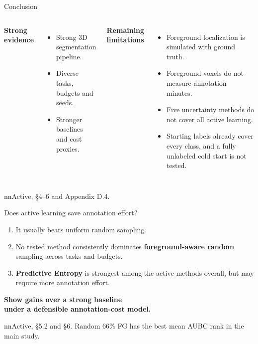 \documentclass[aspectratio=169,11pt]{beamer}
\newcommand{\source}[1]{\vfill{\color{Muted}\fontsize{7}{9}\selectfont #1\par}}
\newcommand{\takeaway}[1]{\vspace{0.2cm}\begin{center}{\color{Accent}\large\bfseries #1}\end{center}}
\begin{document}
\begin{frame}{Conclusion}
\begin{columns}[T,onlytextwidth]
{\color{Teal}\large\textbf{Strong evidence}}\par\vspace{.2cm}
\begin{itemize}\setlength{\itemsep}{8pt}
\item Strong 3D segmentation pipeline.
\item Diverse tasks, budgets and seeds.
\item Stronger baselines and cost proxies.
\end{itemize}
{\color{Accent}\large\textbf{Remaining limitations}}\par\vspace{.2cm}
\begin{itemize}\setlength{\itemsep}{8pt}
\item Foreground localization is simulated with ground truth.
\item Foreground voxels do not measure annotation minutes.
\item Five uncertainty methods do not cover all active learning.
\item Starting labels already cover every class, and a fully unlabeled cold start is not tested.
\end{itemize}
\end{columns}
\source{nnActive, \S4--6 and Appendix D.4.}
\end{frame}

\begin{frame}{Does active learning save annotation effort?}
\vspace{.25cm}
\begin{enumerate}\setlength{\itemsep}{15pt}
\item It usually beats uniform random sampling.
\item No tested method consistently dominates \textbf{foreground-aware random} sampling across tasks and budgets.
\item \textbf{Predictive Entropy} is strongest among the active methods overall, but may require more annotation effort.
\end{enumerate}
\takeaway{Show gains over a strong baseline\\under a defensible annotation-cost model.}
\vspace{.1cm}
\source{nnActive, \S5.2 and \S6. Random 66\% FG has the best mean AUBC rank in the main study.}
\end{frame}
\end{document}
